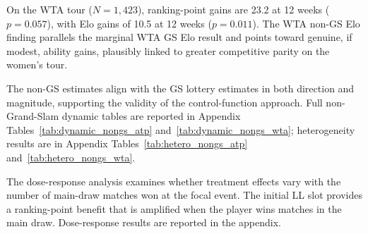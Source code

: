On the WTA tour ($N = 1{,}423$), ranking-point gains are 23.2 at 12 weeks ($p = 0.057$), with Elo gains of 10.5 at 12 weeks ($p = 0.011$). The WTA non-GS Elo finding parallels the marginal WTA GS Elo result and points toward genuine, if modest, ability gains, plausibly linked to greater competitive parity on the women's tour.

The non-GS estimates align with the GS lottery estimates in both direction and magnitude, supporting the validity of the control-function approach. Full non-Grand-Slam dynamic tables are reported in Appendix Tables~\ref{tab:dynamic_nongs_atp} and~\ref{tab:dynamic_nongs_wta}; heterogeneity results are in Appendix Tables~\ref{tab:hetero_nongs_atp} and~\ref{tab:hetero_nongs_wta}.

The dose-response analysis examines whether treatment effects vary with the number of main-draw matches won at the focal event. The initial LL slot provides a ranking-point benefit that is amplified when the player wins matches in the main draw. Dose-response results are reported in the appendix.
